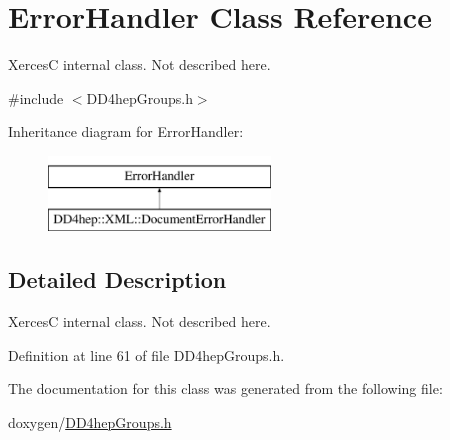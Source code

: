 \hypertarget{class_error_handler}{}\section{Error\+Handler Class Reference}
\label{class_error_handler}


XercesC internal class. Not described here.  




{\ttfamily \#include $<$D\+D4hep\+Groups.\+h$>$}

Inheritance diagram for Error\+Handler\+:\begin{figure}[H]
\begin{center}
\leavevmode
\includegraphics[height=2.000000cm]{class_error_handler}
\end{center}
\end{figure}


\subsection{Detailed Description}
XercesC internal class. Not described here. 

Definition at line 61 of file D\+D4hep\+Groups.\+h.



The documentation for this class was generated from the following file\+:\begin{DoxyCompactItemize}
\item 
doxygen/\hyperlink{_d_d4hep_groups_8h}{D\+D4hep\+Groups.\+h}\end{DoxyCompactItemize}

